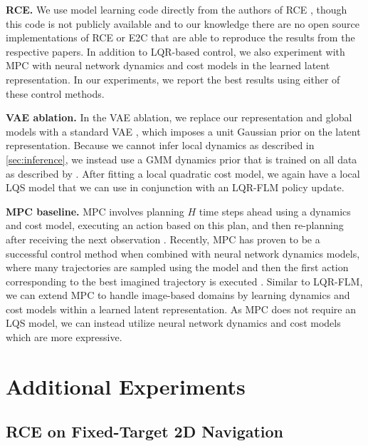 {\bf RCE.} We use model learning code directly from the authors of RCE \citep{rce}, though this code is not publicly available and to our knowledge there are no open source implementations of RCE or E2C \citep{e2c} that are able to reproduce the results from the respective papers. In addition to LQR-based control, we also experiment with MPC with neural network dynamics and cost models in the learned latent representation. In our experiments, we report the best results using either of these control methods.

{\bf VAE ablation.} In the VAE ablation, we replace our representation and global models with a standard VAE \citep{Kingma2014, Rezende2014}, which imposes a unit Gaussian prior on the latent representation. Because we cannot infer local dynamics as described in \autoref{sec:inference}, we instead use a GMM dynamics prior that is trained on all data as described by \citet{gps}. After fitting a local quadratic cost model, we again have a local LQS model that we can use in conjunction with an LQR-FLM policy update.

{\bf MPC baseline.} MPC involves planning $H$ time steps ahead using a dynamics and cost model, executing an action based on this plan, and then re-planning after receiving the next observation \citep{mpc}. Recently, MPC has proven to be a successful control method when combined with neural network dynamics models, where many trajectories are sampled using the model and then the first action corresponding to the best imagined trajectory is executed \citep{nn-dyn,pets}. Similar to LQR-FLM, we can extend MPC to handle image-based domains by learning dynamics and cost models within a learned latent representation. As MPC does not require an LQS model, we can instead utilize neural network dynamics and cost models which are more expressive.


\section{Additional Experiments}
\label{sec:supp-exp}

\subsection{RCE on Fixed-Target 2D Navigation}

